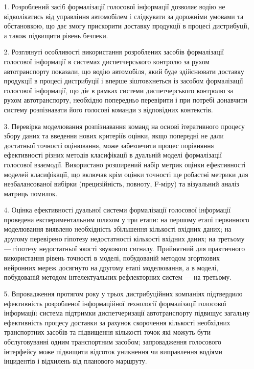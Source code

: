 
1. Розроблений засіб формалізації голосової інформації дозволяє водію не відволікатись від управління автомобілем і слідкувати за дорожніми умовами та обстановкою, що дає змогу прискорити доставку продукції в процесі дистрибуції, а також підвищити рівень безпеки.

2. Розглянуті особливості використання розроблених засобів формалізації голосової інформації в системах диспетчерського контролю за рухом автотранспорту показали, що водію автомобіля, який буде здійснювати доставку продукції в процесі дистрибуції і вперше зіштовхнеться із засобом формалізації голосової інформації, що діє в рамках системи диспетчерського контролю за рухом автотранспорту, необхідно попередньо перевірити і при потребі донавчити систему розпізнавати його голосові команди з відповідних контекстів.

3. Перевірка моделювання розпізнавання команд на основі ітеративного процесу збору даних та введення нових критеріїв оцінки, якщо попередні не дали достатньої точності оцінювання, може забезпечити процес порівняння ефективності різних методів класифікації в дуальній моделі формалізації голосової взаємодії.
Використано розширений набір метрик оцінки ефективності моделей класифікації, що включав крім оцінки точності ще робастні метрики для незбалансованої вибірки (прецизійність, повноту, F-міру) та візуальний аналіз матриць помилок.

4. Оцінка ефективності дуальної системи формалізації голосової інформації проведена експериментальним шляхом у три етапи: на першому етапі первинного моделювання виявлено необхідність збільшення кількості вхідних даних; на другому перевірено гіпотезу недостатності кількості вхідних даних; на третьому --- гіпотезу недостатньої якості звукового сигналу. Прийнятний для практичного використання рівень точності в моделі, побудованій методом згорткових нейронних мереж досягнуто на другому етапі моделювання, а в моделі, побудованій методом інтелектуальних рефлекторних систем --- на третьому.

5. Впровадження протягом року у трьох дистрибуційних компаніях підтвердило ефективність розробленої інформаційної технології формалізації голосової інформації: система підтримки диспетчеризації автотранспорту підвищує загальну ефективність процесу доставки за рахунок скорочення кількості необхідних транспортних засобів та підвищення кількості точок які можуть бути обслуговуванні одним транспортним засобом; запровадження голосового інтерфейсу може підвищити відсоток уникнення чи виправлення водіями інцидентів і відхилень від планового маршруту.

